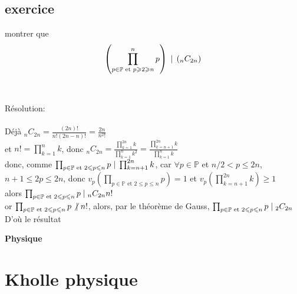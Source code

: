 \documentclass{article}
\begin{document}
\subsection{exercice}

montrer que $$\left({\prod_{p \in \mathbb{P} \text{ et } p \geqslant 2 \geqslant n}^{n}p}\right) \hspace{1mm} | \hspace{1mm} \left({_nC_{2n}}\right)$$ \\ \\

Résolution: \\ \\

Déjà $_nC_{2n} = \frac{(2n)!}{n!(2n - n)!} = \frac{2n}{n^2 !}$ \\
et $n! = \prod_{k=1}^{n} k$, donc $_nC_{2n} = \frac{\prod_{k=1}^{2n} k}{\prod_{k=1}^{n} k^2} = \frac{\prod_{k = n+1}^{2n} k}{\prod_{k=1}^{n} k}$ \\
donc, comme $\prod_{p \in \mathbb{P} \text{ et } 2 \leqslant p \leqslant n} p \hspace{1mm} | \hspace{1mm} \prod_{k=n+1}^{2n} k $, car $\forall p \in \mathbb{P} $ et $ n/2 < p \leqslant 2n$, $n+1 \leqslant2p \leqslant 2n$, donc $v_p\left(\prod_{p \in \mathbb{P} \text{ et } 2 \leqslant p \leqslant n} p \right) = 1$ et $v_p \left( \prod_{k=n+1}^{2n} k \right) \geqslant 1$ \\
alors $\prod_{p \in \mathbb{P} \text{ et } 2 \leqslant p \leqslant n} p \hspace{1mm} | \hspace{1mm} _nC_{2n} n!$ \\
or $\prod_{p \in \mathbb{P} \text{ et } 2 \leqslant p \leqslant n} p \not | \hspace{1mm} n!$, alors, par le théorème de Gauss, $\prod_{p \in \mathbb{P} \text{ et } 2 \leqslant p \leqslant n} p \hspace{1mm} | \hspace{1mm} _2C_{2n}$ \\

D'où le résultat



\begin{center}
\textbf{\large Physique}
\end{center} \vspace{0.2cm}

\section{Kholle physique}
\end{document}
